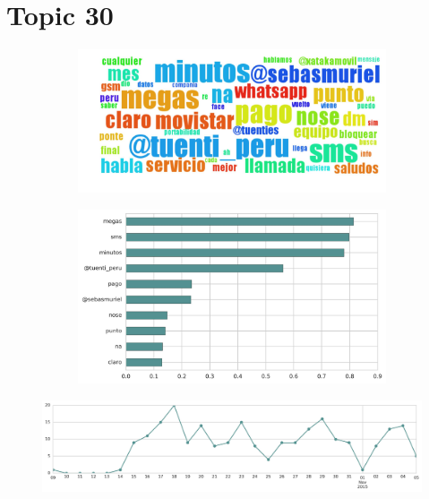 \section{Topic 30}

\begin{figure}[htbp!]
    \centering
    \begin{subfigure}[b]{0.49\textwidth}
        \includegraphics[width=\textwidth]{twitter_all/report_images/topic-30-wordcloud.jpg}
    \end{subfigure}
    \begin{subfigure}[b]{0.49\textwidth}
        \includegraphics[width=\textwidth]{twitter_all/report_images/topic-30-terms.jpg}
    \end{subfigure}
\end{figure}

\begin{figure}[htbp!]
    \centering
    \includegraphics[width=\textwidth]{twitter_all/report_images/topic-30-timeseries.jpg}
\end{figure}

